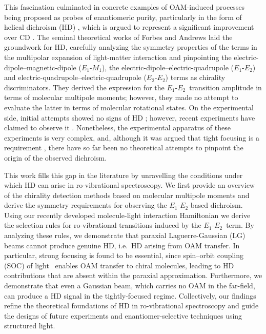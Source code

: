 \documentclass[reprint,aps,prl,twocolumn,superscriptaddress,groupedaddress]{revtex4-2}
\newcommand{\eomo}{$E_1$-$M_1$}
\newcommand{\eoet}{$E_1$-$E_2$}
\newcommand{\etet}{$E_2$-$E_2$}
\begin{document}
This fascination culminated in concrete examples of OAM-induced processes being proposed as probes of enantiomeric purity, particularly in the form of helical dichroism (HD) \cite{ANDREWS2004,Ye2019,Li2021}, which is argued to represent a significant improvement over CD \cite{Ye2019,Li2021}. The seminal theoretical works of Forbes and Andrews \cite{Forbes2018,Forbes2019,Forbes2021} laid the groundwork for HD, carefully analyzing the symmetry properties of the terms in the multipolar expansion of light-matter interaction and pinpointing the electric-dipole–magnetic-dipole (\eomo), the electric-dipole–electric-quadrupole (\eoet) and electric-quadrupole–electric-quadrupole (\etet) terms as chirality discriminators. They derived the expression for the \eoet ~transition amplitude in terms of molecular multipole moments; however, they made no attempt to evaluate the latter in terms of molecular rotational states. On the experimental side, initial attempts showed no signs of HD \cite{Araoka2005,Loeffler2011}; however, recent experiments have claimed to observe it \cite{Rusak2019,Zhang2020,Rouxel2022,Begin2023,Jain2023}. Nonetheless, the experimental apparatus of these experiments is very complex, and, although it was argued that tight focusing is a requirement \cite{Forbes2019}, there have so far been no theoretical attempts to pinpoint the origin of the observed dichroism.

This work fills this gap in the literature by unravelling the conditions under which HD can arise in ro-vibrational spectroscopy. We first provide an overview of the chirality detection methods based on molecular multipole moments and derive the symmetry requirements for observing the \eoet-based dichroism. Using our recently developed molecule-light interaction Hamiltonian \cite{Maslov2024,Maslov_Thesis} we derive the selection rules for ro-vibrational transitions induced by the \eoet~term. By analyzing these rules, we demonstrate that paraxial Laguerre-Gaussian (LG) beams cannot produce genuine HD, i.e.~HD arising from OAM transfer. In particular, strong focusing is found to be essential, since spin–orbit coupling (SOC) of light~\cite{Bliokh2015} enables OAM transfer to chiral molecules, leading to HD contributions that are absent within the paraxial approximation. Furthermore, we demonstrate that even a Gaussian beam, which carries no OAM in the far-field, can produce a HD signal in the tightly-focused regime. Collectively, our findings refine the theoretical foundations of HD in ro-vibrational spectroscopy and guide the designs of future experiments and enantiomer-selective techniques using structured light.\\
\end{document}
